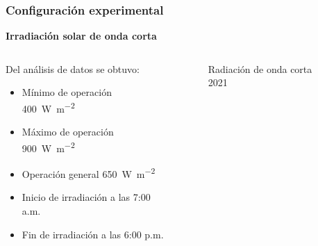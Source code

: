 	\begin{frame}
	    \frametitle{Configuración experimental}
	    \vspace*{2mm}
	    
	    \textbf{\large Irradiación solar de onda corta}\\[5mm]
	    
	    \begin{columns}
		    \begin{column}{0.5\textwidth}
		    		Del análisis de datos se obtuvo:
			    \begin{itemize}
			    		\item Mínimo de operación \qty{400}{\watt\per\m\tothe{2}}
			    		\item Máximo de operación \qty{900}{\watt\per\m\tothe{2}}
			    		\item Operación general \qty{650}{\watt\per\m\tothe{2}}
			    		\item Inicio de irradiación a las 7:00 a.m.
			    		\item Fin de irradiación a las 6:00 p.m.
			    \end{itemize}
		    \end{column}
		    \begin{column}{0.5\textwidth}
			    \centering
		    		\begin{figure}
		    			\centering
		    			\caption{Radiación de onda corta 2021}
		    			\label{fig:ALLSKY_SFC_SW_DWN_surface_2021_3d}
		    		\end{figure}
		    \end{column}
	    \end{columns}
	\end{frame}
	
